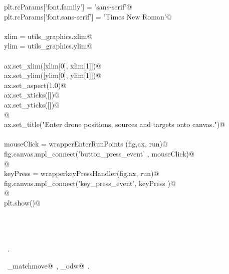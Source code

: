 \documentclass[10pt, english, oneside]{report}
\begin{document}
\begin{appendices}
\begin{flushleft}
\begin{list}{}{}
\mbox{}\verb@    plt.rcParams['font.family'] = 'sans-serif'@\\
\mbox{}\verb@    plt.rcParams['font.sans-serif'] = 'Times New Roman'@\\
\mbox{}\verb@@\\
\mbox{}\verb@    xlim = utils_graphics.xlim@\\
\mbox{}\verb@    ylim = utils_graphics.ylim@\\
\mbox{}\verb@@\\
\mbox{}\verb@    ax.set_xlim([xlim[0], xlim[1]])@\\
\mbox{}\verb@    ax.set_ylim([ylim[0], ylim[1]])@\\
\mbox{}\verb@    ax.set_aspect(1.0)@\\
\mbox{}\verb@    ax.set_xticks([])@\\
\mbox{}\verb@    ax.set_yticks([])@\\
\mbox{}\verb@          @\\
\mbox{}\verb@    ax.set_title("Enter drone positions, sources and targets onto canvas.")@\\
\mbox{}\verb@@\\
\mbox{}\verb@    mouseClick   = wrapperEnterRunPoints (fig,ax, run)@\\
\mbox{}\verb@    fig.canvas.mpl_connect('button_press_event' , mouseClick)@\\
\mbox{}\verb@          @\\
\mbox{}\verb@    keyPress     = wrapperkeyPressHandler(fig,ax, run)@\\
\mbox{}\verb@    fig.canvas.mpl_connect('key_press_event', keyPress   )@\\
\mbox{}\verb@    @\\
\mbox{}\verb@    plt.show()@\\
\mbox{}\verb@@\\
\mbox{}\verb@@\\
\mbox{}\verb@@\\
\mbox{}\verb@@{\NWsep}
\end{list}
\vspace{-1.5ex}
\footnotesize
\begin{list}{}{\setlength{\itemsep}{-\parsep}\setlength{\itemindent}{-\leftmargin}}
\item \NWtxtMacroRefIn\ .
\item \NWtxtIdentsUsed\nobreak\  \verb@algo_matchmove@\nobreak\ , \verb@algo_odw@\nobreak\ .
\item{}
\end{list}
\vspace{4ex}
\end{flushleft}


\end{appendices}
\end{document}
